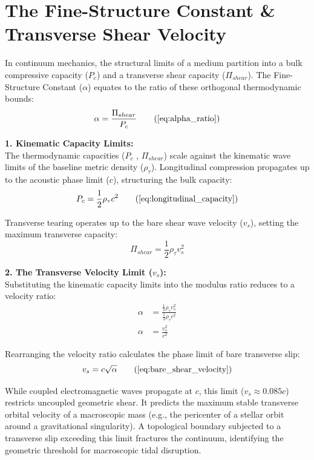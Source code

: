 \section{The Fine-Structure Constant \& Transverse Shear Velocity}
\label{sec:deriv_fine_structure}

In continuum mechanics, the structural limits of a medium partition into a bulk compressive capacity ($P_c$) and a transverse shear capacity ($\Pi_{shear}$). The Fine-Structure Constant ($\alpha$) equates to the ratio of these orthogonal thermodynamic bounds: 
\begin{equation}
    \alpha = \frac{\Pi_{shear}}{P_{c}} \tag{\ref{eq:alpha_ratio}}
\end{equation}

\textbf{1. Kinematic Capacity Limits:} \\
The thermodynamic capacities ($P_c$ , $\Pi_{shear}$) scale against the kinematic wave limits of the baseline metric density ($\rho_\tau$). Longitudinal compression propagates up to the acoustic phase limit ($c$), structuring the bulk capacity: 
\begin{equation}
    P_{c} = \frac{1}{2} \rho_\tau c^2 \tag{\ref{eq:longitudinal_capacity}}
\end{equation}

Transverse tearing operates up to the bare shear wave velocity ($v_s$), setting the maximum transverse capacity:
\begin{equation}
    \Pi_{shear} = \frac{1}{2} \rho_\tau v_s^2 \label{eq:transverse_capacity}
\end{equation}

\textbf{2. The Transverse Velocity Limit ($v_s$):} \\
Substituting the kinematic capacity limits into the modulus ratio reduces to a velocity ratio: 
\begin{align}
    \alpha &= \frac{\frac{1}{2} \rho_\tau v_s^2}{\frac{1}{2} \rho_\tau c^2} \nonumber \\
    \alpha &= \frac{v_s^2}{c^2} \label{eq:alpha_velocity_ratio}
\end{align}

Rearranging the velocity ratio calculates the phase limit of bare transverse slip:
\begin{equation}
    v_s = c \sqrt{\alpha} \tag{\ref{eq:bare_shear_velocity}}
\end{equation}

While coupled electromagnetic waves propagate at $c$, this limit ($v_s \approx 0.085 c$) restricts uncoupled geometric shear. It predicts the maximum stable transverse orbital velocity of a macroscopic mass (e.g., the pericenter of a stellar orbit around a gravitational singularity). A topological boundary subjected to a transverse slip exceeding this limit fractures the continuum, identifying the geometric threshold for macroscopic tidal disruption.


